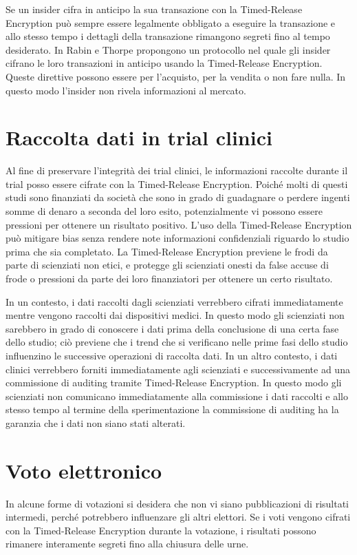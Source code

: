 Se un insider cifra in anticipo la sua transazione con la Timed-Release Encryption
può sempre essere legalmente obbligato a eseguire la transazione e allo stesso tempo
i dettagli della transazione rimangono segreti fino al tempo desiderato.
In \cite{rabin2006time} Rabin e Thorpe propongono un protocollo nel quale gli insider
cifrano le loro transazioni in anticipo usando la Timed-Release Encryption.
Queste direttive possono essere per l'acquisto, per la vendita o non fare nulla. In questo
modo l'insider non rivela informazioni al mercato.

\section{Raccolta dati in trial clinici}
Al fine di preservare l'integrità dei trial clinici, le informazioni raccolte durante il trial
posso essere cifrate con la Timed-Release Encryption.
Poiché molti di questi studi sono finanziati da società che sono in grado di guadagnare
o perdere ingenti somme di denaro a seconda del loro esito,
potenzialmente vi possono essere pressioni per ottenere un risultato positivo.
L'uso della Timed-Release Encryption può mitigare bias senza rendere note informazioni
confidenziali riguardo lo studio prima che sia completato. La Timed-Release Encryption
previene le frodi da parte di scienziati non etici, e protegge gli scienziati onesti
da false accuse di frode o pressioni da parte dei loro finanziatori per ottenere un certo risultato.

In un contesto, i dati raccolti dagli scienziati verrebbero cifrati
immediatamente mentre vengono raccolti dai dispositivi medici. In questo modo gli scienziati
non sarebbero in grado di conoscere i dati prima della conclusione di una certa fase dello studio;
ciò previene che i trend che si verificano nelle prime fasi dello studio influenzino
le successive operazioni di raccolta dati.
In un altro contesto, i dati clinici verrebbero forniti immediatamente agli scienziati
e successivamente ad una commissione di auditing tramite Timed-Release Encryption.
In questo modo gli scienziati non comunicano immediatamente alla commissione i dati raccolti
e allo stesso tempo al termine della sperimentazione
la commissione di auditing ha la garanzia che i dati non siano stati alterati.

\section{Voto elettronico}
In alcune forme di votazioni si desidera che non vi siano pubblicazioni di risultati intermedi,
perché potrebbero influenzare gli altri elettori. Se i voti vengono cifrati con
la Timed-Release Encryption durante la votazione, i risultati possono rimanere interamente segreti
fino alla chiusura delle urne.

